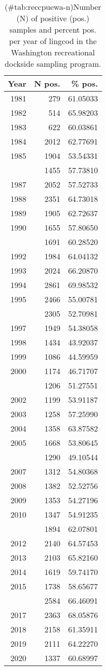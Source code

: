 
\begin{longtable}[t]{rrr}
\caption{(\#tab:reccpuewa-n)Number (N) of positive (pos.) samples and percent pos. per year of lingcod in the Washington recreational dockside sampling program.}\\
\toprule
Year & N pos. & \% pos.\\
\midrule
1981 & 279 & 61.05033\\
1982 & 514 & 65.98203\\
1983 & 622 & 60.03861\\
1984 & 2012 & 62.77691\\
1985 & 1904 & 53.54331\\
\addlinespace
1986 & 1455 & 57.73810\\
1987 & 2052 & 57.52733\\
1988 & 2351 & 64.73018\\
1989 & 1905 & 62.72637\\
1990 & 1655 & 57.80650\\
\addlinespace
1991 & 1691 & 60.28520\\
1992 & 1984 & 64.04132\\
1993 & 2024 & 66.20870\\
1994 & 2861 & 69.98532\\
1995 & 2466 & 55.00781\\
\addlinespace
1996 & 2305 & 52.70981\\
1997 & 1949 & 54.38058\\
1998 & 1434 & 43.92037\\
1999 & 1086 & 44.59959\\
2000 & 1174 & 46.71707\\
\addlinespace
2001 & 1206 & 51.27551\\
2002 & 1199 & 53.91187\\
2003 & 1258 & 57.25990\\
2004 & 1358 & 63.87582\\
2005 & 1668 & 53.80645\\
\addlinespace
2006 & 1290 & 49.10544\\
2007 & 1312 & 54.80368\\
2008 & 1382 & 52.52756\\
2009 & 1353 & 54.27196\\
2010 & 1347 & 54.91235\\
\addlinespace
2011 & 1894 & 62.07801\\
2012 & 2140 & 64.57453\\
2013 & 2103 & 65.82160\\
2014 & 1619 & 59.74170\\
2015 & 1738 & 58.65677\\
\addlinespace
2016 & 2584 & 66.46091\\
2017 & 2363 & 68.05876\\
2018 & 2158 & 61.35911\\
2019 & 2111 & 64.22270\\
2020 & 1337 & 60.68997\\
\bottomrule
\end{longtable}
